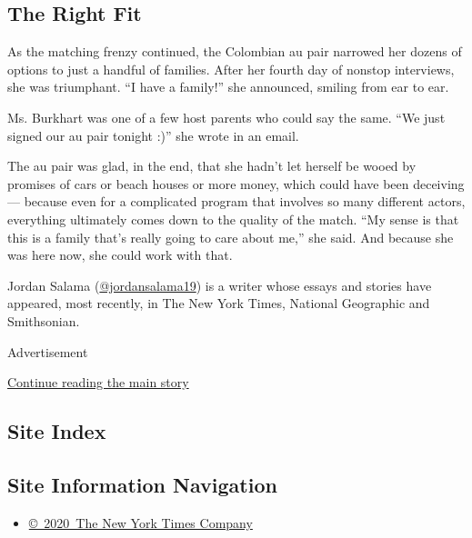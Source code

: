 \hypertarget{the-right-fit}{%
\subsection{The Right Fit}\label{the-right-fit}}

As the matching frenzy continued, the Colombian au pair narrowed her
dozens of options to just a handful of families. After her fourth day of
nonstop interviews, she was triumphant. ``I have a family!'' she
announced, smiling from ear to ear.

Ms. Burkhart was one of a few host parents who could say the same. ``We
just signed our au pair tonight :)'' she wrote in an email.

The au pair was glad, in the end, that she hadn't let herself be wooed
by promises of cars or beach houses or more money, which could have been
deceiving --- because even for a complicated program that involves so
many different actors, everything ultimately comes down to the quality
of the match. ``My sense is that this is a family that's really going to
care about me,'' she said. And because she was here now, she could work
with that.

Jordan Salama
(\href{https://twitter.com/JordanSalama19}{@jordansalama19}) is a writer
whose essays and stories have appeared, most recently, in The New York
Times, National Geographic and Smithsonian.

Advertisement

\protect\hyperlink{after-bottom}{Continue reading the main story}

\hypertarget{site-index}{%
\subsection{Site Index}\label{site-index}}

\hypertarget{site-information-navigation}{%
\subsection{Site Information
Navigation}\label{site-information-navigation}}

\begin{itemize}
\tightlist
\item
  \href{https://help.nytimes3xbfgragh.onion/hc/en-us/articles/115014792127-Copyright-notice}{©~2020~The
  New York Times Company}
\end{itemize}

